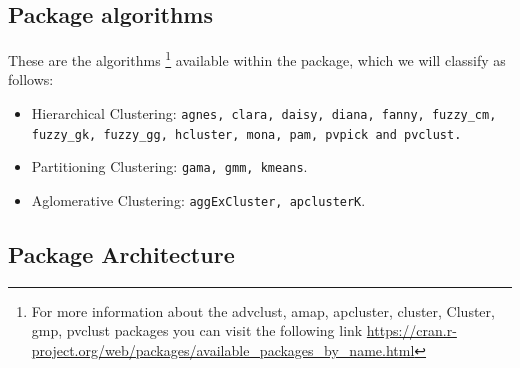 \subsection{Package algorithms}
These are the algorithms \footnote{For more information about the advclust, amap, apcluster, cluster, Cluster, gmp, pvclust packages you can visit the following link \url{https://cran.r-project.org/web/packages/available_packages_by_name.html}} available within the package, which we will classify as follows:
\begin{itemize}
  \item Hierarchical Clustering: \texttt{agnes, clara, daisy, diana, fanny, fuzzy\_cm, fuzzy\_gk, fuzzy\_gg, hcluster, mona, pam, pvpick and pvclust.}
  \item Partitioning Clustering: \texttt{gama, gmm, kmeans}.
  \item Aglomerative Clustering: \texttt{aggExCluster, apclusterK}.
\end{itemize}

\subsection{Package Architecture}

